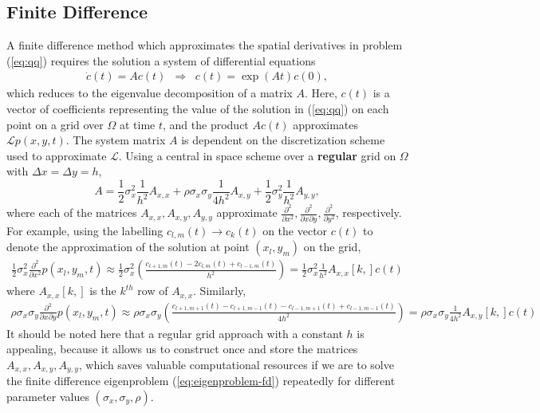 \documentclass[10pt]{article}
\begin{document}
\subsection{Finite Difference} \label{sec:finite-difference} A finite
difference method which approximates the spatial derivatives in
problem (\ref{eq:qq}) requires the solution a system of differential equations
\begin{align}
  \dot{c}(t)= A c(t) &\Rightarrow& c(t) = \exp\left( At \right)c(0) \label{eq:eigenproblem-fd}, 
\end{align}
which reduces to the eigenvalue decomposition of a matrix $A$. Here,
$c(t)$ is a vector of coefficients representing the value of the
solution in (\ref{eq:qq}) on each point on a grid over $\Omega$ at
time $t$, and the product $Ac(t)$ approximates
$\mathcal{L}p(x,y,t)$. The system matrix $A$ is dependent on the
discretization scheme used to approximate $\mathcal{L}$. Using a
central in space scheme over a \textbf{regular} grid on $\Omega$ with
$\Delta x = \Delta y = h$,
\[ A = \frac{1}{2}\sigma_x^2 \frac{1}{h^2}A_{x,x} +
  \rho\sigma_x\sigma_y \frac{1}{4h^2}A_{x,y} + \frac{1}{2}\sigma_y^2
  \frac{1}{h^2}A_{y,y},
\]
where each of the matrices $A_{x,x}, A_{x,y}, A_{y,y}$ approximate
$\frac{\partial^2}{\partial x^2}, \frac{\partial^2}{\partial
  x \partial y}, \frac{\partial^2}{\partial y^2}$, respectively. For
example, using the labelling $c_{l,m}(t) \to c_k(t)$ on the vector $c(t)$ to denote the approximation of the solution at point $(x_l, y_m)$ on the grid,
\begin{align*}
  \frac{1}{2}\sigma_x^2 \frac{\partial^2}{\partial x^2} p(x_l,y_m,t) \approx \frac{1}{2}\sigma_x^2 \left( \frac{c_{l+1,m}(t) - 2c_{l,m}(t) + c_{l-1,m}(t)}{h^2} \right) = \frac{1}{2}\sigma_x^2 \frac{1}{h^2}A_{x,x}[k,] c(t) 
\end{align*}
where $A_{x,x}[k,]$ is the $k^{th}$ row of $A_{x,x}$. Similarly,
\begin{align*}
  \rho\sigma_x\sigma_y \frac{\partial^2}{\partial x \partial y} p(x_l,y_m,t) \approx \rho\sigma_x\sigma_y \left( \frac{c_{l+1,m+1}(t) - c_{l+1,m-1}(t) - c_{l-1,m+1}(t) + c_{l-1,m-1}(t)}{4h^2} \right) = \rho\sigma_x\sigma_y \frac{1}{4h^2}A_{x,y}[k,] c(t) 
\end{align*}
It should be noted here that a regular grid approach with a constant
$h$ is appealing, because it allows us to construct once and store the
matrices $A_{x,x}, A_{x,y}, A_{y,y}$, which saves valuable
computational resources if we are to solve the finite difference
eigenproblem (\ref{eq:eigenproblem-fd}) repeatedly for different
parameter values $(\sigma_x,\sigma_y,\rho)$.
\end{document}
